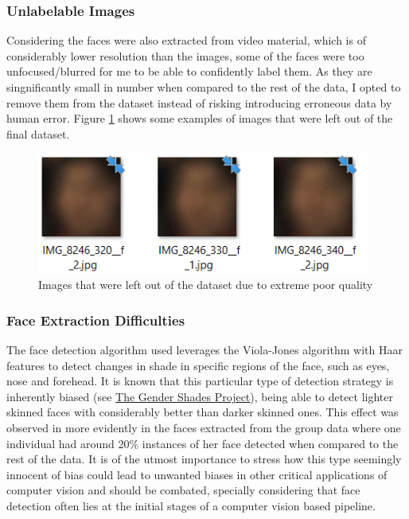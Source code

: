 \documentclass[11pt]{article}
\begin{document}
        \subsubsection{Unlabelable Images}
            Considering the faces were also extracted from video material, which is of considerably lower resolution than the images, some of the faces were too unfocused/blurred for me to be able to confidently label them. As they are singnificantly small in number when compared to the rest of the data, I opted to remove them from the dataset instead of risking introducing erroneous data by human error. Figure \ref{fig:label:blurry} shows some examples of images that were left out of the final dataset.
            \begin{figure}[ht]
                \centering
                \includegraphics[height=4cm]{./Images/labeling/blurry.png}
                \caption{Images that were left out of the dataset due to extreme poor quality}
                \label{fig:label:blurry}
            \end{figure}

        \subsubsection{Face Extraction Difficulties}
            The face detection algorithm used leverages the Viola-Jones algorithm with Haar features to detect changes in shade in specific regions of the face, such as eyes, nose and forehead. It is known that this particular type of detection strategy is inherently biased (see \href{http://gendershades.org/}{The Gender Shades Project}), being able to detect lighter skinned faces with considerably better than darker skinned ones. This effect was observed in more evidently in the faces extracted from the group data where one individual had around 20\% instances of her face detected when compared to the rest of the data. It is of the utmost importance to stress how this type seemingly innocent of bias could lead to unwanted biases in other critical applications of computer vision and should be combated, specially considering that face detection often lies at the initial stages of a computer vision based pipeline.
\end{document}
